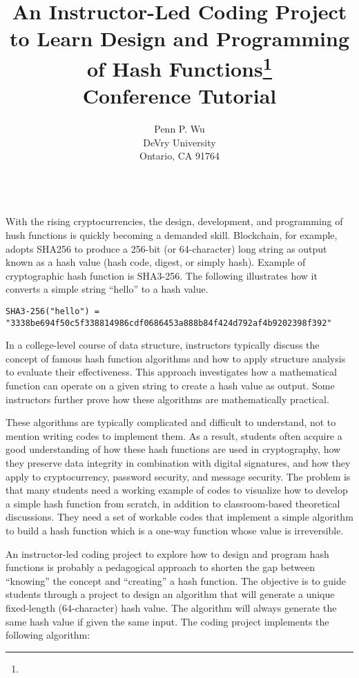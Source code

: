 \documentclass{article}
\title{An Instructor-Led Coding Project to Learn Design and Programming of Hash Functions\footnote{\protect}
\\
\vspace{0.2in}
\large{
Conference Tutorial
}}
\author{
Penn P. Wu\\
DeVry University\\
Ontario, CA 91764\\
\email{pwu@devry.edu}\\
}
\begin{document}
\maketitle

With the rising cryptocurrencies, the design, development, and programming of hush functions is quickly becoming a demanded skill. Blockchain, for example, adopts SHA256 to produce a 256-bit (or 64-character) long string as output known as a hash value (hash code, digest, or simply hash). Example of cryptographic hash function is SHA3-256. The following illustrates how it converts a simple string ``hello'' to a hash value. 

\small
\begin{verbatim}
SHA3-256("hello") = 
"3338be694f50c5f338814986cdf0686453a888b84f424d792af4b9202398f392"
\end{verbatim}
\normalsize

In a college-level course of data structure, instructors typically discuss the concept of famous hash function algorithms and how to apply structure analysis to evaluate their effectiveness. This approach investigates how a mathematical function can operate on a given string to create a hash value as output. Some instructors further prove how these algorithms are mathematically practical. 

These algorithms are typically complicated and difficult to understand, not to mention writing codes to implement them. As a result, students often acquire a good understanding of how these hash functions are used in cryptography, how they preserve data integrity in combination with digital signatures, and how they apply to cryptocurrency, password security, and message security. The problem is that many students need a working example of codes to visualize how to develop a simple hash function from scratch, in addition to classroom-based theoretical discussions. They need a set of workable codes that implement a simple algorithm to build a hash function which is a one-way function whose value is irreversible.

An instructor-led coding project to explore how to design and program hash functions is probably a pedagogical approach to shorten the gap between ``knowing'' the concept and ``creating'' a hash function. The objective is to guide students through a project to design an algorithm that will generate a unique fixed-length (64-character) hash value. The algorithm will always generate the same hash value if given the same input. The coding project implements the following algorithm:
\end{document}
